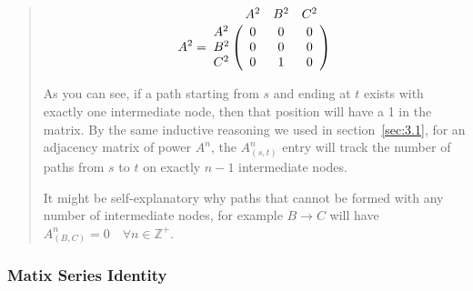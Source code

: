 \documentclass[12pt]{article}
\begin{document}
\begin{quote}
    \[
        A^2 =
        \bordermatrix{
            & A^2 & B^2 & C^2 \cr
            A^2 & 0 & 0 & 0 \cr
            B^2 & 0 & 0 & 0 \cr
            C^2 & 0 & 1 & 0 \cr
        }
    \]

    As you can see, if a path starting from $s$ and ending at $t$ exists with exactly one intermediate node, then that position will have a 1 in the matrix. By the same inductive reasoning we used in section~\ref{sec:3.1}, for an adjacency matrix of power $A^n$, the $A^n_{(s, t)}$ entry will track the number of paths from $s$ to $t$ on exactly $n - 1$ intermediate nodes.




    It might be self-explanatory why paths that cannot be formed with any number of intermediate nodes, for example $B \to C$ will have $A^n_{(B, C)} = 0 \quad \forall n \in \mathds{Z}^+$.
\end{quote}

\subsubsection{Matix Series Identity}
\end{document}
